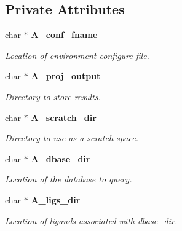 \subsection*{Private Attributes}
\begin{CompactItemize}
\item 
char $\ast$ \bf{A\_\-conf\_\-fname}\label{classASCbase_1_1SearchParameters_3cb03731b1e4917864cade8bb39d7f95}

\begin{CompactList}\small\item\em Location of environment configure file. \item\end{CompactList}\item 
char $\ast$ \bf{A\_\-proj\_\-output}\label{classASCbase_1_1SearchParameters_b89a1895609e2d782727d5b81e70fff4}

\begin{CompactList}\small\item\em Directory to store results. \item\end{CompactList}\item 
char $\ast$ \bf{A\_\-scratch\_\-dir}\label{classASCbase_1_1SearchParameters_27e0256e5782174a8a5da589e84ef6da}

\begin{CompactList}\small\item\em Directory to use as a scratch space. \item\end{CompactList}\item 
char $\ast$ \bf{A\_\-dbase\_\-dir}\label{classASCbase_1_1SearchParameters_2cbe4df7b590f7cb0fff7584fcecf59b}

\begin{CompactList}\small\item\em Location of the database to query. \item\end{CompactList}\item 
char $\ast$ \bf{A\_\-ligs\_\-dir}\label{classASCbase_1_1SearchParameters_3dc1434fb48a7773cbe4fd247a87de77}

\begin{CompactList}\small\item\em Location of ligands associated with dbase\_\-dir. \item\end{CompactList}\end{CompactItemize}
